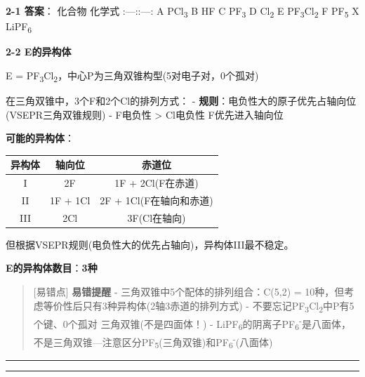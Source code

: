 \textbf{2-1 答案}：
\textbar{} 化合物 \textbar{} 化学式 \textbar{}
\textbar:---:\textbar:---:\textbar{}
\textbar{} A \textbar{} PCl\textsubscript{3} \textbar{}
\textbar{} B \textbar{} HF \textbar{}
\textbar{} C \textbar{} PF\textsubscript{3} \textbar{}
\textbar{} D \textbar{} Cl\textsubscript{2} \textbar{}
\textbar{} E \textbar{} PF\textsubscript{3}Cl\textsubscript{2} \textbar{}
\textbar{} F \textbar{} PF\textsubscript{5} \textbar{}
\textbar{} X \textbar{} LiPF\textsubscript{6} \textbar{}

\textbf{2-2 E的异构体}

E = PF\textsubscript{3}Cl\textsubscript{2}，中心P为三角双锥构型(5对电子对，0个孤对)

在三角双锥中，3个F和2个Cl的排列方式：
- \textbf{规则}：电负性大的原子优先占轴向位(VSEPR三角双锥规则)
- F电负性 \textgreater{} Cl电负性 \箭 F优先进入轴向位

\textbf{可能的异构体}：

{\def\LTcaptype{none} %
\begin{longtable}[]{@{}ccc@{}}
\toprule\noalign{}
异构体 & 轴向位 & 赤道位 \\
\midrule\noalign{}
\endhead
\bottomrule\noalign{}
\endlastfoot
I & 2F & 1F + 2Cl(F在赤道) \\
II & 1F + 1Cl & 2F + 1Cl(F在轴向和赤道) \\
III & 2Cl & 3F(Cl在轴向) \\
\end{longtable}
}

但根据VSEPR规则(电负性大的优先占轴向)，异构体III最不稳定。

\textbf{E的异构体数目}：\textbf{3种}

\begin{quote}
{[}易错点{]} \textbf{易错提醒}
- 三角双锥中5个配体的排列组合：C(5,2) = 10种，但考虑等价性后只有3种异构体(2轴3赤道的排列方式)
- 不要忘记PF\textsubscript{3}Cl\textsubscript{2}中P有5个键、0个孤对 \箭 三角双锥(不是四面体！)
- LiPF\textsubscript{6}的阴离子PF\textsubscript{6}\textsuperscript{-}是八面体，不是三角双锥---注意区分PF\textsubscript{5}(三角双锥)和PF\textsubscript{6}\textsuperscript{-}(八面体)
\end{quote}

\begin{center}\rule{0.5\linewidth}{0.5pt}\end{center}

\begin{center}\rule{0.5\linewidth}{0.5pt}\end{center}

